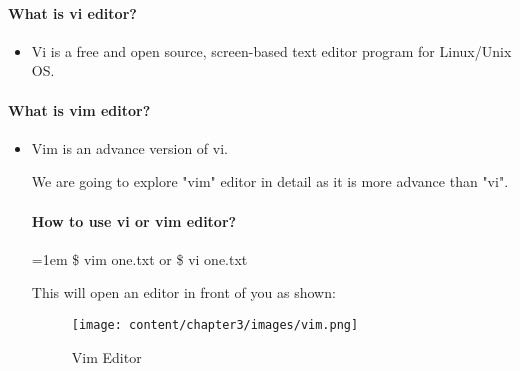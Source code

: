 \setlength{\columnsep}{3pt}
\begin{flushleft}
	\bigskip
	\paragraph{What is vi editor?}
	\begin{itemize}
		\item Vi is a free and open source, screen-based text editor program for Linux/Unix OS.
	\end{itemize}


	\paragraph{What is vim editor?}
	\begin{itemize}
		\item Vim is an advance version of vi.
		
	We are going to explore "vim" editor in detail as it is more advance than "vi".

	\paragraph{How to use vi or vim editor?}
			\bigskip
			\begin{tcolorbox}[breakable,notitle,boxrule=1pt,colback=black,colframe=black]
				\color{green}
				\font=1em
				\$ vim one.txt
				\newline
				or
				\newline
				\$ vi one.txt
				\font=4pt
			\end{tcolorbox}
			This will open an editor in front of you as shown:
			\begin{figure}[h!]
			\centering
			\texttt{[image: content/chapter3/images/vim.png]}
			\caption{Vim Editor}
			\label{fig:vim_editor}
		\end{figure}
	
	\end{itemize}
	
\end{flushleft}

\newpage






